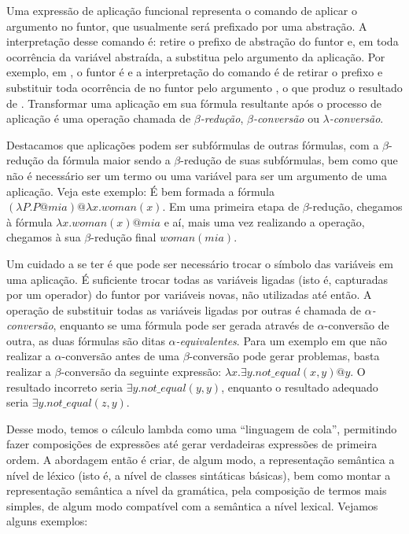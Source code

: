 Uma expressão de aplicação funcional representa o comando de aplicar o argumento no funtor, que usualmente será prefixado por uma abstração. A interpretação desse comando é: retire o prefixo de abstração do funtor e, em toda ocorrência da variável abstraída, a substitua pelo argumento da aplicação. Por exemplo, em , o funtor é  e a interpretação do comando é de retirar o prefixo  e substituir toda ocorrência de  no funtor pelo argumento , o que produz o resultado de . Transformar uma aplicação em sua fórmula resultante após o processo de aplicação é uma operação chamada de \textit{$\beta$-redução}, \textit{$\beta$-conversão} ou \textit{$\lambda$-conversão}. \cite[p.~67]{BlackburnBos:2005}

Destacamos que aplicações podem ser subfórmulas de outras fórmulas, com a $\beta$-redução da fórmula maior sendo a $\beta$-redução de suas subfórmulas, bem como que não é necessário ser um termo ou uma variável para ser um argumento de uma aplicação. Veja este exemplo:
É bem formada a fórmula $(\lambda P. P@mia)@\lambda x.woman(x)$. Em uma primeira etapa de $\beta$-redução, chegamos à fórmula $\lambda x.woman(x)@mia$ e aí, mais uma vez realizando a operação, chegamos à sua $\beta$-redução final $woman(mia)$.

Um cuidado a se ter é que pode ser necessário trocar o símbolo das variáveis em uma aplicação. É suficiente trocar todas as variáveis ligadas (isto é, capturadas por um operador) do funtor por variáveis novas, não utilizadas até então. A operação de substituir todas as variáveis ligadas por outras é chamada de \textit{$\alpha$-conversão}, enquanto se uma fórmula pode ser gerada através de $\alpha$-conversão de outra, as duas fórmulas são ditas \textit{$\alpha$-equivalentes}. Para um exemplo em que não realizar a $\alpha$-conversão antes de uma $\beta$-conversão pode gerar problemas, basta realizar a $\beta$-conversão da seguinte expressão: $\lambda x .\exists y. not\_equal(x,y) @ y$. O resultado incorreto seria $\exists y. not\_equal(y,y)$, enquanto o resultado adequado seria $\exists y. not\_equal(z,y)$.

Desse modo, temos o cálculo lambda como uma ``linguagem de cola'', permitindo fazer composições de expressões até gerar verdadeiras expressões de primeira ordem. A abordagem então é criar, de algum modo, a representação semântica a nível de léxico (isto é, a nível de classes sintáticas básicas), bem como montar a representação semântica a nível da gramática, pela composição de termos mais simples, de algum modo compatível com a semântica a nível lexical. Vejamos alguns exemplos:

